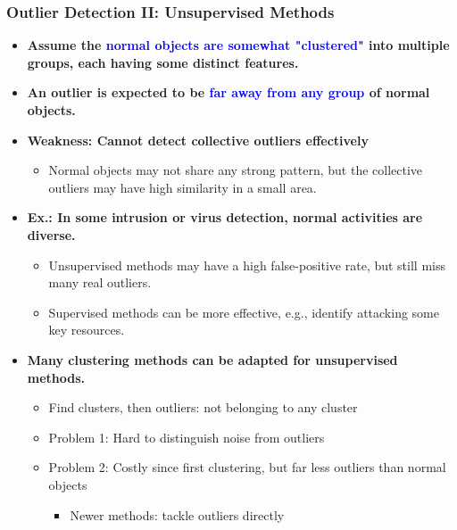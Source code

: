 \documentclass[aspectratio=169,t,xcolor=dvipsnames]{beamer}
\newcommand{\blue}[1]{\textbf{\textcolor{blue}{#1}}}
\begin{document}
%

\begin{frame}
	\frametitle{Outlier Detection II: Unsupervised Methods }
	\begin{itemize}
		\item \textbf{Assume the \blue{normal objects are somewhat "clustered"} into multiple groups, each having some distinct features.}
		\item\textbf{ An outlier is expected to be \blue{far away from any group} of normal objects.}
		\item \textbf{Weakness: Cannot detect collective outliers effectively}
		      \begin{itemize}
		      	\item Normal objects may not share any strong pattern, but the collective outliers may have high similarity in a small area.
		      \end{itemize}
		\item \textbf{Ex.: In some intrusion or virus detection, normal activities are diverse.}
		      \begin{itemize}
		      	\item Unsupervised methods may have a high false-positive rate, but still miss many real outliers.
		      	\item Supervised methods can be more effective, e.g., identify attacking some key resources.
		      \end{itemize}
		\item \textbf{Many clustering methods can be adapted for unsupervised methods.}
		      \begin{itemize}
		      	\item Find clusters, then outliers: not belonging to any cluster
		      	\item Problem 1: Hard to distinguish noise from outliers
		      	\item Problem 2: Costly since first clustering, but far less outliers than normal objects
		      	      \begin{itemize}
		      	      	\item Newer methods: tackle outliers directly
		      	      \end{itemize}
		      \end{itemize}
	\end{itemize}
\end{frame}

%
\end{document}
